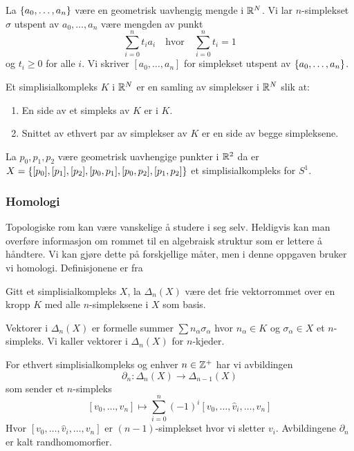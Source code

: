 \begin{definisjon}\label{def:n-simp} 
  La $\left\{a_0,\dots,a_n\right\}$ være en geometrisk uavhengig mengde
  i $\mathbb{R}^N$. Vi lar $n$-simplekset $\sigma$ utspent av
  $a_0,\dots,a_n$ være mengden av punkt
  \[\sum_{i=0}^nt_ia_i\quad\text{hvor}\quad\sum_{i=0}^nt_i = 1\]
  og $t_i\geq0$ for alle $i$. Vi skriver $[a_0,\dots,a_n]$ for
  simplekset utspent av $\left\{a_0,\dots,a_n\right\}$.
\end{definisjon}

\begin{definisjon}\label{def:SimpKomp}
  Et simplisialkompleks $K$ i $\mathbb{R}^N$ er en samling av simplekser
  i $\mathbb{R}^N$ slik at:
  \begin{enumerate}
    \item En side av et simpleks av $K$ er i $K$.\\
    \item Snittet av ethvert par av simplekser av $K$ er en side
      av begge simpleksene.
  \end{enumerate}
\end{definisjon}

\begin{eksempel}\label{eks:Sirkel}
  La $p_0,p_1,p_2$ være geometrisk uavhengige punkter
  i $\mathbb{R}^2$ da er $X
  = \left\{[p_0],[p_1],[p_2],[p_0,p_1],[p_0,p_2],[p_1,p_2]\right\}$ et
  simplisialkompleks for $S^1$.
\end{eksempel}

\subsubsection{Homologi}
Topologiske rom kan være vanskelige å studere i seg selv.
Heldigvis kan man overføre informasjon om rommet til en algebraisk
struktur som er lettere å håndtere. Vi kan gjøre dette på
forskjellige måter, men i denne oppgaven bruker vi homologi.
Definisjonene er fra \citep[seksjon 2.1]{Hatcher:478079}

\begin{definisjon}\label{def:KjdKomp}
  Gitt et simplisialkompleks $X$, la $\Delta_n(X)$ være det frie
  vektorrommet over en kropp $K$ med alle $n$-simpleksene i $X$
  som basis.
\end{definisjon}

Vektorer i $\Delta_n(X)$ er formelle summer $\sum
n_\alpha\sigma_\alpha$ hvor $n_\alpha\in K$ og $\sigma_\alpha\in
X$ et $n$-simpleks. Vi kaller vektorer i $\Delta_n(X)$ for
$n$-kjeder.

\begin{definisjon}\label{def:randhom}
  For ethvert simplisialkompleks og enhver $n\in\mathbb{Z}^+$ har vi
  avbildingen
  \[\partial_n: \Delta_n(X)\to\Delta_{n-1}(X)\]
  som sender et $n$-simpleks
  \[[v_0,\dots,v_n]\mapsto
  \sum_{i=0}^n(-1)^i[v_0,\dots,\hat{v}_i,\dots,v_n]\]
  Hvor $[v_0,\dots,\hat{v}_i,\dots,v_n]$ er $(n-1)$-simplekset hvor
  vi sletter $v_i$. Avbildingene $\partial_n$ er kalt
  randhomomorfier.
\end{definisjon}

